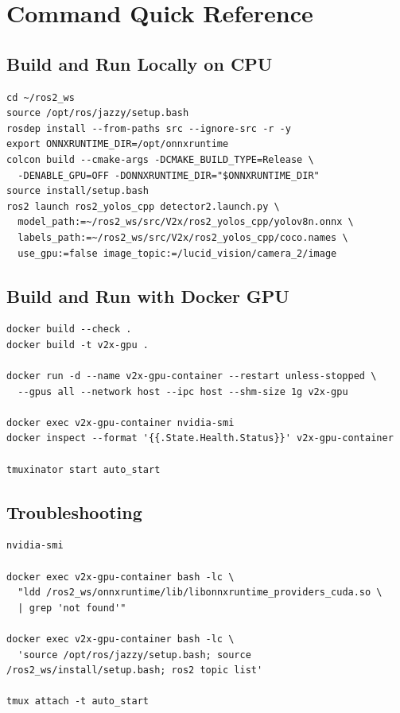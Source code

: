 \documentclass[11pt,a4paper]{article}
\begin{document}
\section{Command Quick Reference}

\subsection{Build and Run Locally on CPU}

\begin{lstlisting}
cd ~/ros2_ws
source /opt/ros/jazzy/setup.bash
rosdep install --from-paths src --ignore-src -r -y
export ONNXRUNTIME_DIR=/opt/onnxruntime
colcon build --cmake-args -DCMAKE_BUILD_TYPE=Release \
  -DENABLE_GPU=OFF -DONNXRUNTIME_DIR="$ONNXRUNTIME_DIR"
source install/setup.bash
ros2 launch ros2_yolos_cpp detector2.launch.py \
  model_path:=~/ros2_ws/src/V2x/ros2_yolos_cpp/yolov8n.onnx \
  labels_path:=~/ros2_ws/src/V2x/ros2_yolos_cpp/coco.names \
  use_gpu:=false image_topic:=/lucid_vision/camera_2/image
\end{lstlisting}

\subsection{Build and Run with Docker GPU}

\begin{lstlisting}
docker build --check .
docker build -t v2x-gpu .

docker run -d --name v2x-gpu-container --restart unless-stopped \
  --gpus all --network host --ipc host --shm-size 1g v2x-gpu

docker exec v2x-gpu-container nvidia-smi
docker inspect --format '{{.State.Health.Status}}' v2x-gpu-container

tmuxinator start auto_start
\end{lstlisting}

\subsection{Troubleshooting}

\begin{lstlisting}
nvidia-smi

docker exec v2x-gpu-container bash -lc \
  "ldd /ros2_ws/onnxruntime/lib/libonnxruntime_providers_cuda.so \
  | grep 'not found'"

docker exec v2x-gpu-container bash -lc \
  'source /opt/ros/jazzy/setup.bash; source /ros2_ws/install/setup.bash; ros2 topic list'

tmux attach -t auto_start
\end{lstlisting}
\end{document}
